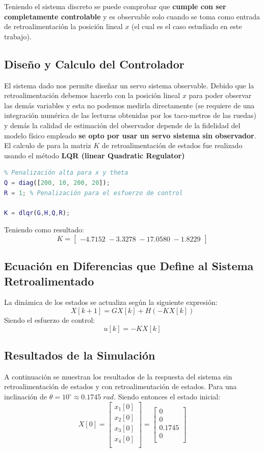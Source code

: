 \documentclass[final,times,twocolumn,5p]{ResumenEjecutivo}
\begin{document}
Teniendo el sistema discreto se puede comprobar que \textbf{cumple con ser completamente controlable} y es observable solo cuando se toma como entrada de retroalimentación la posición lineal $x$ (el cual es el caso  estudiado en este trabajo).\\

\subsection{Diseño y Calculo del Controlador}
El sistema dado nos permite diseñar un servo sistema observable. Debido que la retroalimentación debemos hacerlo con la posición lineal $x$ para poder observar las demás variables y esta no podemos medirla directamente (se requiere de una integración numérica de las lecturas obtenidas por los taco-metros de las ruedas) y demás la calidad de estimación del observador depende de la fidelidad del modelo físico empleado \textbf{se opto por usar un servo sistema sin observador}.\\
El calculo de para la matriz $K$ de retroalimentación de estados fue realizado usando el método \textbf{LQR (linear Quadratic Regulator)}\\
\begin{lstlisting}[language=Matlab]
%% 4. DISENO DE LA REALIMENTACION DE ESTADOS
% Penalización alta para x y theta
Q = diag([200, 10, 200, 20]); 
R = 1; % Penalización para el esfuerzo de control

K = dlqr(G,H,Q,R);
\end{lstlisting}

Teniendo como resultado:
\[
K=
\begin{bmatrix}
-4.7152\;   -3.3278\;  -17.0580\;   -1.8229
\end{bmatrix}
\]

\subsection{Ecuación en Diferencias que Define al Sistema Retroalimentado}
La dinámica de los estados se actualiza según la siguiente expresión:
\[
X[k+1]= GX[k]+H(-KX[k])
\]
Siendo el esfuerzo  de control:
\[
u[k]= -KX[k]
\]
\subsection{Resultados de la Simulación}
A continuación se muestran los resultados de la respuesta del sistema sin retroalimentación de estados y con retroalimentación de estados. Para una inclinación de $\theta=10^\circ \approx0.1745\;rad$. Siendo entonces el estado inicial:
\[
X[0]=
\begin{bmatrix}
x_1[0]\\
x_2[0] \\
x_3[0]\\
x_4[0] \\
\end{bmatrix}
=
\begin{bmatrix}
0\\
0 \\
0.1745\\
0 \\
\end{bmatrix}
\]
\end{document}
